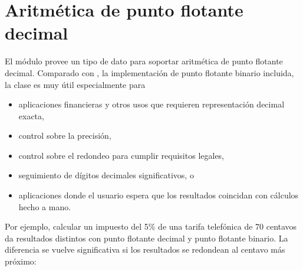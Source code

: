\documentclass[a5paper,10pt,spanish]{sphinxmanual}
\begin{document}
\section{Aritmética de punto flotante decimal}
\label{\detokenize{tutorial/stdlib2:decimal-floating-point-arithmetic}}\label{\detokenize{tutorial/stdlib2:tut-decimal-fp}}
\sphinxAtStartPar
El módulo  provee un tipo de dato  para soportar aritmética de punto flotante decimal.  Comparado con , la implementación de punto flotante binario incluida, la clase es muy útil especialmente para
\begin{itemize}
\item {} 
\sphinxAtStartPar
aplicaciones financieras y otros usos que requieren representación decimal exacta,

\item {} 
\sphinxAtStartPar
control sobre la precisión,

\item {} 
\sphinxAtStartPar
control sobre el redondeo para cumplir requisitos legales,

\item {} 
\sphinxAtStartPar
seguimiento de dígitos decimales significativos, o

\item {} 
\sphinxAtStartPar
aplicaciones donde el usuario espera que los resultados coincidan con cálculos hecho a mano.

\end{itemize}

\sphinxAtStartPar
Por ejemplo, calcular un impuesto del 5\% de una tarifa telefónica de 70 centavos da resultados distintos con punto flotante decimal y punto flotante binario. La diferencia se vuelve significativa si los resultados se redondean al centavo más próximo:

\begin{sphinxVerbatim}[commandchars=\\\{\}]
   
   
   
\end{sphinxVerbatim}
\end{document}
